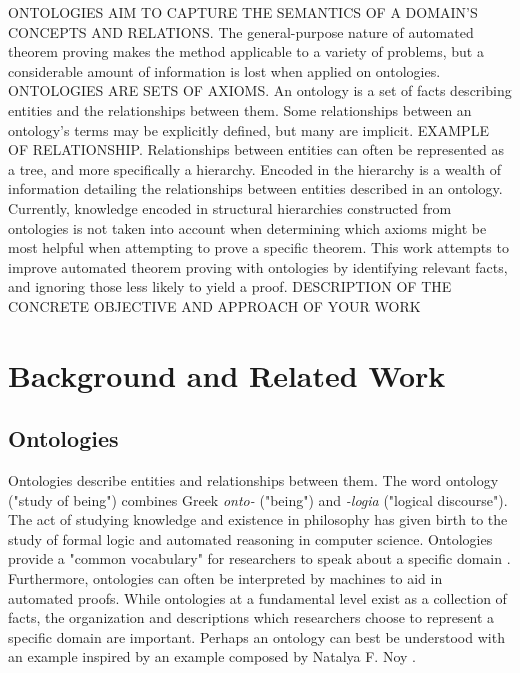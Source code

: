 \documentclass{article}
\begin{document}
ONTOLOGIES AIM TO CAPTURE THE SEMANTICS OF A DOMAIN'S CONCEPTS AND RELATIONS. The general-purpose nature of automated theorem proving makes the method applicable to a variety of problems, but a considerable amount of information is lost when applied on ontologies. ONTOLOGIES ARE SETS OF AXIOMS. An ontology is a set of facts describing entities and the relationships between them. Some relationships between an ontology's terms may be explicitly defined, but many are implicit. EXAMPLE OF RELATIONSHIP. Relationships between entities can often be represented as a tree, and more specifically a hierarchy. Encoded in the hierarchy is a wealth of information detailing the relationships between entities described in an ontology. Currently, knowledge encoded in structural hierarchies constructed from ontologies is not taken into account when determining which axioms might be most helpful when attempting to prove a specific theorem. This work attempts to improve automated theorem proving with ontologies by identifying relevant facts, and ignoring those less likely to yield a proof. DESCRIPTION OF THE CONCRETE OBJECTIVE AND APPROACH OF YOUR WORK


	\newpage
	\section{Background and Related Work}

		\subsection{Ontologies}
		
Ontologies describe entities and relationships between them. The word ontology ("study of being") combines Greek \textit{onto-} ("being") and \textit{-logia} ("logical discourse"). The act of studying knowledge and existence in philosophy has given birth to the study of formal logic and automated reasoning in computer science. Ontologies provide a "common vocabulary" for researchers to speak about a specific domain \cite{noy2001ontology}. Furthermore, ontologies can often be interpreted by machines to aid in automated proofs. While ontologies at a fundamental level exist as a collection of facts, the organization and descriptions which researchers choose to represent a specific domain are important. Perhaps an ontology can best be understood with an example inspired by an example composed by Natalya F. Noy \cite{noy2001ontology}. 
\end{document}
